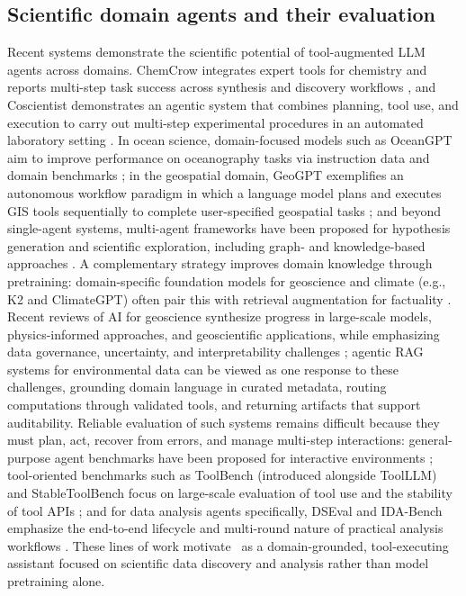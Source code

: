 \subsection{Scientific domain agents and their evaluation}
Recent systems demonstrate the scientific potential of tool-augmented LLM agents across domains.
ChemCrow integrates expert tools for chemistry and reports multi-step task success across synthesis and discovery workflows \citep{Bran2024ChemCrow}, and Coscientist demonstrates an agentic system that combines planning, tool use, and execution to carry out multi-step experimental procedures in an automated laboratory setting \citep{Boiko2023Coscientist}.
In ocean science, domain-focused models such as OceanGPT aim to improve performance on oceanography tasks via instruction data and domain benchmarks \citep{Bi2023OceanGPT}; in the geospatial domain, GeoGPT exemplifies an autonomous workflow paradigm in which a language model plans and executes GIS tools sequentially to complete user-specified geospatial tasks \citep{Zhang2024GeoGPT}; and beyond single-agent systems, multi-agent frameworks have been proposed for hypothesis generation and scientific exploration, including graph- and knowledge-based approaches \citep{Ghafarollahi2024SciAgents}.
A complementary strategy improves domain knowledge through pretraining: domain-specific foundation models for geoscience and climate (e.g., K2 and ClimateGPT) often pair this with retrieval augmentation for factuality \citep{Deng2023K2,Thulke2024ClimateGPT}.
Recent reviews of AI for geoscience synthesize progress in large-scale models, physics-informed approaches, and geoscientific applications, while emphasizing data governance, uncertainty, and interpretability challenges \citep{Zhao2024AIforGeoscience}; agentic RAG systems for environmental data can be viewed as one response to these challenges, grounding domain language in curated metadata, routing computations through validated tools, and returning artifacts that support auditability.
Reliable evaluation of such systems remains difficult because they must plan, act, recover from errors, and manage multi-step interactions: general-purpose agent benchmarks have been proposed for interactive environments \citep{Liu2023AgentBench}; tool-oriented benchmarks such as ToolBench (introduced alongside ToolLLM) and StableToolBench focus on large-scale evaluation of tool use and the stability of tool APIs \citep{Qin2023ToolLLM,Guo2024StableToolBench}; and for data analysis agents specifically, DSEval and IDA-Bench emphasize the end-to-end lifecycle and multi-round nature of practical analysis workflows \citep{Zhang2024DSEval,Li2025IDABench}.
These lines of work motivate \cmapagent\ as a domain-grounded, tool-executing assistant focused on scientific data discovery and analysis rather than model pretraining alone.

